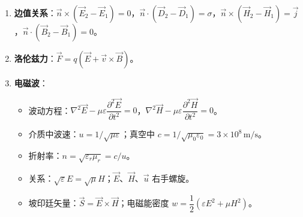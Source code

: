 \documentclass[12pt,a4paper]{ctexart}
\begin{document}
\begin{enumerate}[leftmargin=3em,label=\textbf{公式\arabic*}：,ref=公式\arabic*]
    \item \textbf{边值关系}：$\vec n\times(\vec E_2-\vec E_1)=0$，$\vec n\cdot(\vec D_2-\vec D_1)=\sigma$，$\vec n\times(\vec H_2-\vec H_1)=\vec j$，$\vec n\cdot(\vec B_2-\vec B_1)=0$。

    \item \textbf{洛伦兹力}：$\vec F=q(\vec E+\vec v\times\vec B)$。

    \item \textbf{电磁波}：
    \begin{itemize}
        \item 波动方程：$\nabla^2\vec E-\mu\varepsilon\dfrac{\partial^2\vec E}{\partial t^2}=0$，$\nabla^2\vec H-\mu\varepsilon\dfrac{\partial^2\vec H}{\partial t^2}=0$。
        \item 介质中波速：$u=1/\sqrt{\mu\varepsilon}$；真空中 $c=1/\sqrt{\mu_0\varepsilon_0}=3\times10^8\,\text{m/s}$。
        \item 折射率：$n=\sqrt{\varepsilon_r\mu_r}=c/u$。
        \item 关系：$\sqrt{\varepsilon}E=\sqrt{\mu}H$；$\vec E$、$\vec H$、$\vec u$ 右手螺旋。
        \item 坡印廷矢量：$\vec S=\vec E\times\vec H$；电磁能密度 $w=\dfrac{1}{2}(\varepsilon E^2+\mu H^2)$。
    \end{itemize}

\end{enumerate}
\end{document}
